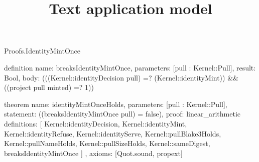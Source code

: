 \begin{lexlean}{Proofs.IdentityMintOnce}
\title{Text application model}
\begin{semanticmodule}
definition{
  name: breaksIdentityMintOnce,
  parameters: [pull : Kernel::Pull],
  result: Bool,
  body: (((Kernel::identityDecision pull) =? (Kernel::identityMint)) && ((project pull minted) =? 1))
}

theorem{
  name: identityMintOnceHolds,
  parameters: [pull : Kernel::Pull],
  statement: ((breaksIdentityMintOnce pull) = false),
  proof: linear_arithmetic{
    definitions: [
      Kernel::identityDecision,
      Kernel::identityMint,
      Kernel::identityRefuse,
      Kernel::identityServe,
      Kernel::pullBlake3Holds,
      Kernel::pullNameHolds,
      Kernel::pullSizeHolds,
      Kernel::sameDigest,
      breaksIdentityMintOnce
    ]
  },
  axioms: [Quot.sound, propext]
}
\end{semanticmodule}
\end{lexlean}
